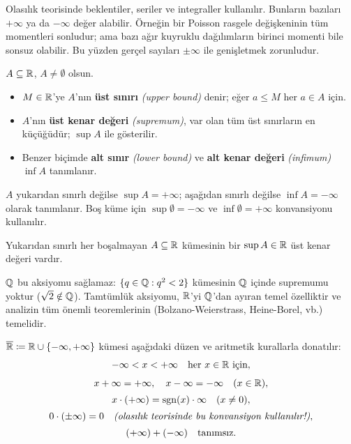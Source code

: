 \begin{motivasyon}[§0.4]
Olasılık teorisinde beklentiler, seriler ve integraller kullanılır. Bunların
bazıları $+\infty$ ya da $-\infty$ değer alabilir. Örneğin bir Poisson rasgele
değişkeninin tüm momentleri sonludur; ama bazı ağır kuyruklu dağılımların birinci
momenti bile sonsuz olabilir. Bu yüzden gerçel sayıları $\pm\infty$ ile
genişletmek zorunludur.
\end{motivasyon}

\begin{tanim}\label{def:supinf}
$A \subseteq \mathbb{R}$, $A \neq \emptyset$ olsun.
\begin{itemize}
  \item $M \in \mathbb{R}$'ye $A$'nın \textbf{üst sınırı} \emph{(upper bound)} denir;
        eğer $a \leq M$ her $a \in A$ için.
  \item $A$'nın \textbf{üst kenar değeri} \emph{(supremum)}, var olan tüm üst
        sınırların en küçüğüdür; $\sup A$ ile gösterilir.
  \item Benzer biçimde \textbf{alt sınır} \emph{(lower bound)} ve
        \textbf{alt kenar değeri} \emph{(infimum)} $\inf A$ tanımlanır.
\end{itemize}
$A$ yukarıdan sınırlı değilse $\sup A = +\infty$; aşağıdan sınırlı değilse
$\inf A = -\infty$ olarak tanımlanır. Boş küme için $\sup \emptyset = -\infty$
ve $\inf \emptyset = +\infty$ konvansiyonu kullanılır.
\end{tanim}

\begin{aksiyom}
\label{ax:tamtumluk}
Yukarıdan sınırlı her boşalmayan $A \subseteq \mathbb{R}$ kümesinin bir
$\sup A \in \mathbb{R}$ üst kenar değeri vardır.
\end{aksiyom}

\begin{notkutu}
$\mathbb{Q}$ bu aksiyomu sağlamaz: $\{q \in \mathbb{Q} : q^2 < 2\}$ kümesinin
$\mathbb{Q}$ içinde supremumu yoktur ($\sqrt{2} \notin \mathbb{Q}$).
Tamtümlük aksiyomu, $\mathbb{R}$'yi $\mathbb{Q}$'dan ayıran temel özelliktir ve
analizin tüm önemli teoremlerinin (Bolzano-Weierstrass, Heine-Borel, vb.) temelidir.
\end{notkutu}

\begin{tanim}\label{def:Rbar}
$\Rbar \coloneqq \R \cup \{-\infty, +\infty\}$ kümesi
aşağıdaki düzen ve aritmetik kurallarla donatılır:
\begin{gather*}
  -\infty < x < +\infty \quad \text{her } x \in \mathbb{R} \text{ için},\\[4pt]
  x + \infty = +\infty, \quad
  x - \infty = -\infty \quad (x \in \mathbb{R}), \\[2pt]
  x \cdot (+\infty) = \operatorname{sgn}(x) \cdot \infty \quad (x \neq 0), \\[2pt]
  0 \cdot (\pm\infty) = 0
  \quad \text{\emph{(olasılık teorisinde bu konvansiyon kullanılır!)}}, \\[2pt]
  (+\infty) + (-\infty) \quad \text{tanımsız.}
\end{gather*}
\end{tanim}

